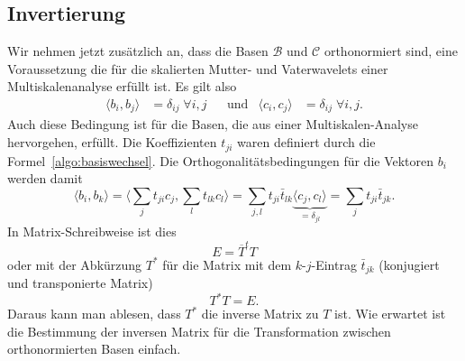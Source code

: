 \subsection{Invertierung}
Wir nehmen jetzt zusätzlich an, dass die Basen $\mathcal{B}$ und $\mathcal{C}$
orthonormiert sind, eine Voraussetzung die für die skalierten Mutter- und
Vaterwavelets einer Multiskalenanalyse erfüllt ist.
Es gilt also
\[
\begin{aligned}
\langle b_i,b_j\rangle &=\delta_{ij}\;\forall i,j
&&\text{und}
&
\langle c_i,c_j\rangle &=\delta_{ij}\;\forall i,j.
\end{aligned}
\]
Auch diese Bedingung ist für die Basen, die aus einer Multiskalen-Analyse hervorgehen, erfüllt.
Die Koeffizienten $t_{ji}$ waren definiert durch die
Formel~\eqref{algo:basiswechsel}.
Die Orthogonalitätsbedingungen für die Vektoren $b_i$ werden damit
\[
\langle b_i,b_k\rangle
=
\biggl\langle
\sum_{j}t_{ji}c_j,\sum_{l}t_{lk}c_l
\biggr\rangle
=
\sum_{j,l} t_{ji}\bar{t}_{lk}
\underbrace{\langle c_j,c_l\rangle}_{\displaystyle=\delta_{jl}}
=
\sum_{j} t_{ji}\bar{t}_{jk}.
\]
In Matrix-Schreibweise ist dies
\[
E
=
\overline{T}^tT
\]
oder mit der Abkürzung $T^*$ für die Matrix mit dem $k$-$j$-Eintrag
$\bar{t}_{jk}$ (konjugiert und transponierte Matrix) 
\[
T^*T=E.
\]
Daraus kann man ablesen, dass $T^*$ die inverse Matrix zu $T$ ist.
Wie erwartet ist die Bestimmung der inversen Matrix für die Transformation 
zwischen orthonormierten Basen einfach.


